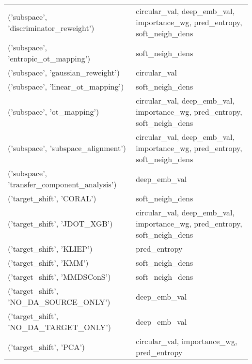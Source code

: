 \begin{tabular}{ll}
 ('subspace', 'discriminator\_reweight')              & circular\_val, deep\_emb\_val, importance\_wg, pred\_entropy, soft\_neigh\_dens \\
 ('subspace', 'entropic\_ot\_mapping')                 & soft\_neigh\_dens                                                          \\
 ('subspace', 'gaussian\_reweight')                   & circular\_val                                                             \\
 ('subspace', 'linear\_ot\_mapping')                   & soft\_neigh\_dens                                                          \\
 ('subspace', 'ot\_mapping')                          & circular\_val, deep\_emb\_val, importance\_wg, pred\_entropy, soft\_neigh\_dens \\
 ('subspace', 'subspace\_alignment')                  & circular\_val, deep\_emb\_val, importance\_wg, pred\_entropy, soft\_neigh\_dens \\
 ('subspace', 'transfer\_component\_analysis')         & deep\_emb\_val                                                             \\
 ('target\_shift', 'CORAL')                           & soft\_neigh\_dens                                                          \\
 ('target\_shift', 'JDOT\_XGB')                        & circular\_val, deep\_emb\_val, importance\_wg, pred\_entropy, soft\_neigh\_dens \\
 ('target\_shift', 'KLIEP')                           & pred\_entropy                                                             \\
 ('target\_shift', 'KMM')                             & soft\_neigh\_dens                                                          \\
 ('target\_shift', 'MMDSConS')                        & soft\_neigh\_dens                                                          \\
 ('target\_shift', 'NO\_DA\_SOURCE\_ONLY')               & deep\_emb\_val                                                             \\
 ('target\_shift', 'NO\_DA\_TARGET\_ONLY')               & deep\_emb\_val                                                             \\
 ('target\_shift', 'PCA')                             & circular\_val, importance\_wg, pred\_entropy                                \\

\end{tabular}
